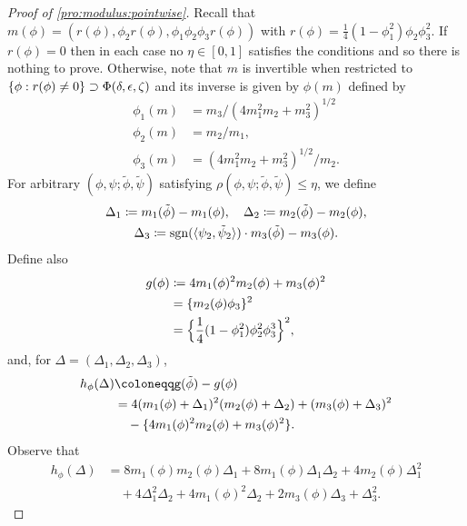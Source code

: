 \documentclass[journal]{IEEEtran}
\newcommand{\sgn}{\mathrm{sgn}}
\newcommand{\1}{\boldsymbol{1}}
\DeclarePairedDelimiter{\Inner}{\langle}{\rangle}
\DeclarePairedDelimiter{\braces}{\{}{\}}
\begin{document}
\begin{proof}[Proof of \cref{pro:modulus:pointwise}]
	Recall that $m(\phi)=(r(\phi),\phi_2 r(\phi),\phi_1\phi_2\phi_3 r(\phi))$ with $r(\phi)=\tfrac{1}{4}(1-\phi_1^2)\phi_2\phi_3^2$.
	If $r(\phi)=0$ then in each case no $\eta\in[0,1]$ satisfies the conditions and so there is nothing to prove.
	Otherwise, note that $m$ is invertible when restricted to  $\braces{\phi: r(\phi)\neq 0}\supset \Phi(\delta,\epsilon,\zeta)$
	and its inverse is given by $\phi(m)$ defined by
	\begin{align*}
		\phi_1(m) &= m_3 / (4m_1^2m_2 + m_3^2)^{1/2} \\
		\phi_2(m) &= m_2/m_1, \\
		\phi_3(m) &= (4m_1^2m_2 + m_3^2)^{1/2}/m_2.
	\end{align*}
	For arbitrary $(\phi,\psi;\tilde{\phi},\tilde{\psi})$ satisfying $\rho(\phi,\psi;\tilde{\phi},\tilde{\psi}) \leq \eta$, we define
	\begin{gather*}
		\Delta_1 \coloneqq m_1(\tilde{\phi}) - m_1(\phi),\quad%
		\Delta_2 \coloneqq m_2(\tilde{\phi}) - m_2(\phi),\\%
		\Delta_3 \coloneqq \sgn(\Inner{\psi_2,\tilde{\psi}_2})\cdot m_3(\tilde{\phi}) - m_3(\phi).
	\end{gather*}
	Define also
	\begin{align*}
		g(\phi)
		&\coloneqq 4m_1(\phi)^2m_2(\phi) + m_3(\phi)^2\\
		&= \braces{m_2(\phi)\phi_3 }^2\\
		&= \braces[\Big]{\frac{1}{4}(1-\phi_1^2)\phi_2^2 \phi_3^3 }^2,
	\end{align*}
	and, for $\Delta=(\Delta_1,\Delta_2,\Delta_3)$,
	\begin{equation*}
		\begin{split}
			h_{\phi}(\Delta)
			&\coloneqq%
			g(\tilde{\phi}) - g(\phi)\\
			&= 4(m_1(\phi) + \Delta_1)^2(m_2(\phi) + \Delta_2) + (m_3(\phi) + \Delta_3)^2\\
                  &\quad- \braces{4m_1(\phi)^2m_2(\phi) + m_3(\phi)^2}.
		\end{split}
	\end{equation*}
	Observe that
	\begin{equation*}
		\begin{split}
			h_{\phi}(\Delta)%
			&= 8m_1(\phi)m_2(\phi)\Delta_1 + 8m_1(\phi)\Delta_1\Delta_2 + 4m_2(\phi)\Delta_1^2\\
			\label{eq:57}
			&\quad+ 4\Delta_1^2\Delta_2 + 4m_1(\phi)^2\Delta_2 + 2m_3(\phi)\Delta_3 + \Delta_3^2.
		\end{split}
	\end{equation*}


\end{proof}
\end{document}
